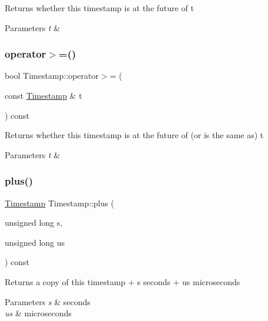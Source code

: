 Returns whether this timestamp is at the future of t 
\begin{DoxyParams}{Parameters}
{\em t} & \\
\hline
\end{DoxyParams}
\mbox{\label{class_d_utils_1_1_timestamp_ade494d1dad26c52bf93c189342a1a69a}} 
\subsubsection{\texorpdfstring{operator$>$=()}{operator>=()}}
{\footnotesize\ttfamily bool Timestamp\+::operator$>$= (\begin{DoxyParamCaption}\item[{const \mbox{\hyperlink{class_d_utils_1_1_timestamp}{Timestamp}} \&}]{t }\end{DoxyParamCaption}) const}

Returns whether this timestamp is at the future of (or is the same as) t 
\begin{DoxyParams}{Parameters}
{\em t} & \\
\hline
\end{DoxyParams}
\mbox{\label{class_d_utils_1_1_timestamp_aaee4b5b30d2130e622636350c1332fcf}} 
\subsubsection{\texorpdfstring{plus()}{plus()}}
{\footnotesize\ttfamily \mbox{\hyperlink{class_d_utils_1_1_timestamp}{Timestamp}} Timestamp\+::plus (\begin{DoxyParamCaption}\item[{unsigned long}]{s,  }\item[{unsigned long}]{us }\end{DoxyParamCaption}) const}

Returns a copy of this timestamp + s seconds + us microseconds 
\begin{DoxyParams}{Parameters}
{\em s} & seconds \\
\hline
{\em us} & microseconds \\
\hline
\end{DoxyParams}
\mbox{\label{class_d_utils_1_1_timestamp_a439bcff577f3ae30e8918897ecb33e76}} 
